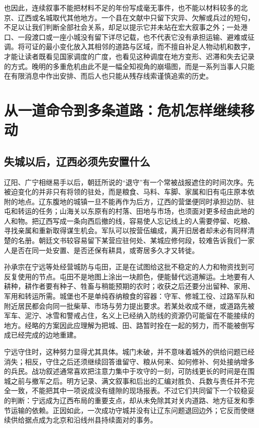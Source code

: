 也因此，连续叙事不能把材料不足的年份写成毫无事件，也不能以材料较多的北京、辽西或名城取代其他地方。一个县在文献中只留下灾异、欠解或兵过的短句，不足以让我们判断全部社会关系，却足以提示它并未站在宏大叙事之外；一处港口、一段渡口或一座小城没有留下详尽记载，也不代表它没有承担运输、避难或征调。将可证的最小变化放入其相邻的道路与区域，而不擅自补足人物动机和数字，才能让读者既看见国家调度的广度，也看见这种调度在地方变形、迟滞和失去记录的方式。晚明的多重危机由此不是一幅全知视角的崩塌图，而是一系列当事人只能在有限消息中作出安排、而后人也只能从残存线索谨慎追索的历史。

\section{从一道命令到多条道路：危机怎样继续移动}

\subsection{失城以后，辽西必须先安置什么}

辽阳、广宁相继易手以后，朝廷所说的“退守”有一个常被战报遮住的时间次序。先被迫变化的并非只有将领的驻处，而是粮食、马料、车脚、家属和旧有屯庄原本依附的地点。辽东腹地的城镇一旦不能再作为后方，辽西的营堡便同时承担边防、驻屯和转运的任务；山海关以东原有的村落、田地与市场，也须面对更多经由此地的人和物。把辽西写成一条向西后撤的线，容易使人忘记线上的人需要停留、吃粮、寻找亲属和重新取得谋生机会。军队可以按营伍编成，离开旧居者却未必有同样清楚的名册。朝廷文书较容易留下某营应驻何处、某城应修何段，较难告诉我们一家人是否在同一处安置、是否还保有耕具，或寄居多久才又转徙。

孙承宗在宁远等处经营城防与屯田，正是在试图给这批不稳定的人力和物资找到可反复使用的节点。屯田不是地图上涂出一块颜色，便能替代远道解运。土地要有人耕种，耕作者要有种子、牲畜与稍能预期的农时；收获之后还要分出留种、家用、军用和转运所需。城堡也不是单纯吞纳粮食的容器：守军、修城工役、过路军队和附近居民都会向同一批柴草、市场与劳力提出要求。若某处收成不继，或道路先被军车、泥泞、冰雪和警戒占住，名义上已经纳入防线的资源仍可能留在不能接续的地方。经略的方案因此应理解为把城、田、路暂时拴在一起的努力，而不能被倒写成已经完成的边地重建。

宁远守住时，这种努力显得尤其具体。城门未破，并不意味着城外的供给问题已经消失；相反，守住之后还须继续回答谁留守、粮从何来、如何修补、何处接纳增多的兵民。战功叙述通常喜欢把注意力集中于攻守的一刻，可防线更长的时间是在围城之前与撤军之后。明方记录、满文叙事和后出的汇编对胜负、兵数与责任并不完全一致，不能把其中一项说成没有缝隙的现场报表。不过它们共同留下一个较稳妥的判断：宁远成为辽西布局的重要支点，却从未免除其对关内道路、地方征发和季节运输的依赖。正因如此，一次成功守城并没有让辽东问题退回边外；它反而使继续供给据点成为北京和沿线州县持续面对的事务。

